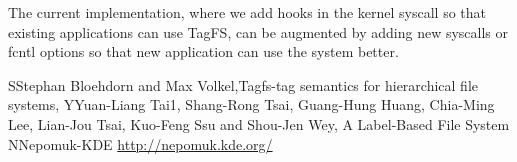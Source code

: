 The current implementation, where we add hooks in the kernel syscall so that existing applications
can use TagFS, can be augmented by adding new syscalls or fcntl options so that new application can use the
system better.

\begin{thebibliography}{1}
	\bibitem SStephan Bloehdorn and Max Volkel,Tagfs-tag semantics for hierarchical file systems, 
	\bibitem YYuan-Liang Tai1, Shang-Rong Tsai, Guang-Hung Huang, Chia-Ming Lee,
Lian-Jou Tsai, Kuo-Feng Ssu and Shou-Jen Wey, A Label-Based File System
    \bibitem NNepomuk-KDE \url{http://nepomuk.kde.org/}
\end{thebibliography}




